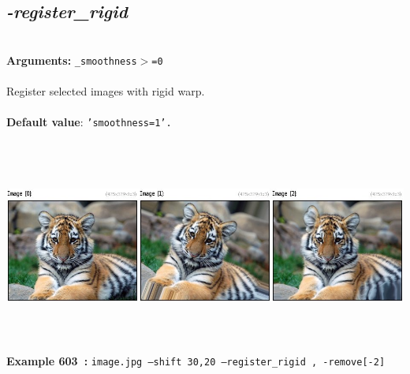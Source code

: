 \documentclass[a4paper,11pt,twoside]{book}
\begin{document}
\subsection{\emph{-register\_rigid} }\vspace*{-0.5em}
~\\\textbf{Arguments: } 
{\small \texttt{\_smoothness$>$=0}}\\~\\
Register selected images with rigid warp.
~\\~\\\textbf{Default value}: {\small \texttt{'smoothness=1'.}}
\begin{center}\includegraphics[keepaspectratio=true,height=7cm,width=\textwidth]{img/gmic_def603.jpg}\\
{\footnotesize \textbf{Example 603~:} \texttt{image.jpg --shift 30,20 --register\_rigid , -remove[-2]}}
\end{center}
\end{document}
